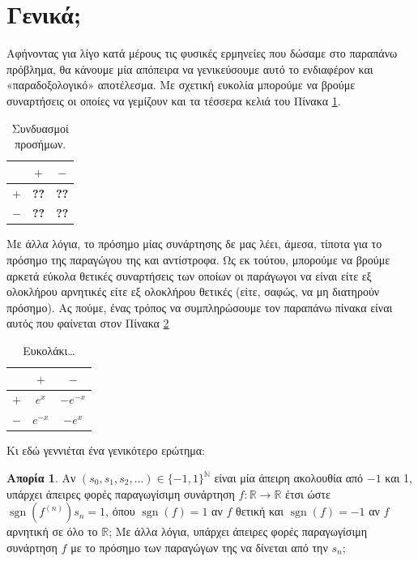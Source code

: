 \documentclass[11pt,a4paper]{article}
\newcommand{\R}{\mathbb{R}}
\newcommand{\N}{\mathbb{N}}
\DeclareMathOperator{\sgn}{sgn}
\theoremstyle{definition}
\newtheorem{quest}{Απορία}[section]
\begin{document}
	\section{Γενικά;}
	Αφήνοντας για λίγο κατά μέρους τις φυσικές ερμηνείες που δώσαμε στο παραπάνω πρόβλημα, θα κάνουμε μία απόπειρα να γενικεύσουμε αυτό το ενδιαφέρον και «παραδοξολογικό» αποτέλεσμα. Με σχετική ευκολία μπορούμε να βρούμε συναρτήσεις οι οποίες να γεμίζουν και τα τέσσερα κελιά του Πίνακα \ref{tab:1}.
	
	\begin{table}[!htb]
		\centering
		\begin{tabular}{c|c|c}
			\diagbox{$f$}{$f'$} & $+$ & $-$ \\\hline
			$+$ & \textbf{??} & \textbf{??} \\\hline
			$-$ & \textbf{??} & \textbf{??} 
		\end{tabular}
		\caption{Συνδυασμοί προσήμων.}
		\label{tab:1}
	\end{table}

	Με άλλα λόγια, το πρόσημο μίας συνάρτησης δε μας λέει, άμεσα, τίποτα για το πρόσημο της παραγώγου της και αντίστροφα. Ως εκ τούτου, μπορούμε να βρούμε αρκετά εύκολα θετικές συναρτήσεις των οποίων οι παράγωγοι να είναι είτε εξ ολοκλήρου αρνητικές είτε εξ ολοκλήρου θετικές (είτε, σαφώς, να μη διατηρούν πρόσημο). Ας πούμε, ένας τρόπος να συμπληρώσουμε τον παραπάνω πίνακα είναι αυτός που φαίνεται στον Πίνακα \ref{tab:2}
	
	\begin{table}[!htb]
		\centering
		\def\arraystretch{1.2}
		\begin{tabular}{c|c|c}
			\diagbox{$f$}{$f'$} & $+$ & $-$ \\\hline
			$+$ & $e^x$ & $-e^{-x}$ \\\hline
			$-$ & $e^{-x}$ & $-e^x$ 
		\end{tabular}
		\caption{Ευκολάκι\ldots}
		\label{tab:2}
	\end{table}

	Κι εδώ γεννιέται ένα γενικότερο ερώτημα:
	
	\begin{quest}\label{quest:sign}
		Αν $(s_0,s_1,s_2,\ldots)\in\{-1,1\}^\N$ είναι μία άπειρη ακολουθία από $-1$ και 1, υπάρχει άπειρες φορές παραγωγίσιμη συνάρτηση $f:\R\to\R$ έτσι ώστε $\sgn\left(f^{(n)}\right)s_n=1$, όπου $\sgn(f)=1$ αν $f$ θετική και $\sgn(f)=-1$ αν $f$ αρνητική σε όλο το $\R$; Με άλλα λόγια, υπάρχει άπειρες φορές παραγωγίσιμη συνάρτηση $f$ με το πρόσημο των παραγώγων της να δίνεται από την $s_n$;
	\end{quest}
\end{document}
